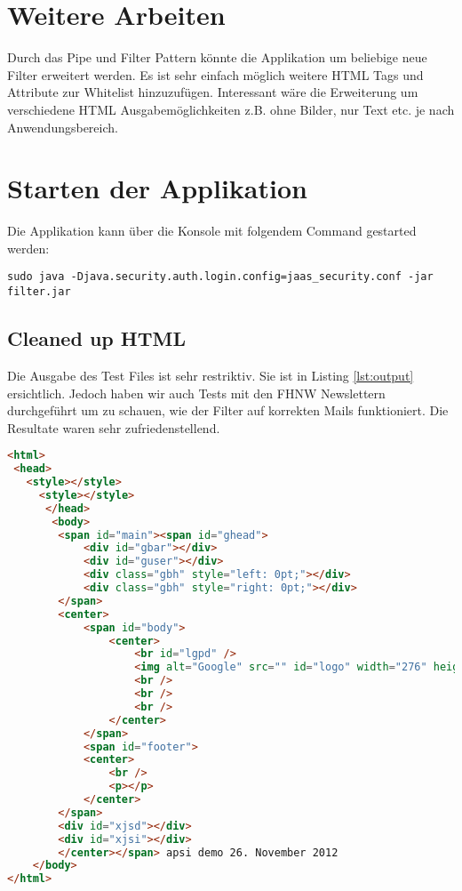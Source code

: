 \section{Weitere Arbeiten}

Durch das Pipe und Filter Pattern könnte die Applikation um beliebige neue Filter erweitert werden. Es ist sehr einfach möglich weitere HTML Tags und Attribute zur Whitelist hinzuzufügen. Interessant wäre die Erweiterung um verschiedene HTML Ausgabemöglichkeiten z.B. ohne Bilder, nur Text etc. je nach Anwendungsbereich.

\section{Starten der Applikation}

Die Applikation kann über die Konsole mit folgendem Command gestarted werden:
\newline
\begin{lstlisting}[caption=Start der Applikation]
sudo java -Djava.security.auth.login.config=jaas_security.conf -jar filter.jar 
\end{lstlisting}
\newpage
\begin{appendix}
\section{Cleaned up HTML}

Die Ausgabe des Test Files ist sehr restriktiv. Sie ist in Listing \ref{lst:output} ersichtlich. 
Jedoch haben wir auch Tests mit den FHNW Newslettern
durchgeführt um zu schauen, wie der Filter auf korrekten Mails funktioniert. Die Resultate waren sehr 
zufriedenstellend. 

\begin{lstlisting}[caption=Resultat des Filters auf dem Test-File,language=HTML,label={lst:output}]
<html>
 <head>
   <style></style>
     <style></style>
      </head>
       <body>
        <span id="main"><span id="ghead">
            <div id="gbar"></div>
            <div id="guser"></div>
            <div class="gbh" style="left: 0pt;"></div>
            <div class="gbh" style="right: 0pt;"></div>
        </span> 
        <center>
            <span id="body">
                <center>
                    <br id="lgpd" />
                    <img alt="Google" src="" id="logo" width="276" height="110" />
                    <br />
                    <br />
                    <br />
                </center>
            </span> 
            <span id="footer">
            <center>
                <br />
                <p></p>
            </center>
        </span> 
        <div id="xjsd"></div>
        <div id="xjsi"></div>
        </center></span> apsi demo 26. November 2012 
    </body>
</html>

\end{lstlisting}
\end{appendix}
